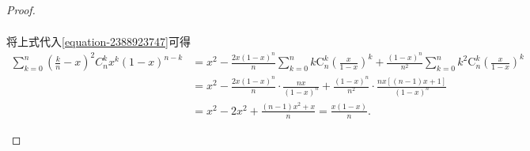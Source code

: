 \documentclass[../../main.tex]{subfiles}
\begin{document}
\begin{proof}
\begin{enumerate}
\begin{gather*}
\end{gather*}
将上式代入\eqref{equation-2388923747}可得
\begin{align*}
\sum_{k=0}^n{\left( \frac{k}{n}-x \right) ^2C_{n}^{k}x^k\left( 1-x \right) ^{n-k}}&=x^2-\frac{2x\left( 1-x \right) ^n}{n}\sum_{k=0}^n{k\mathrm{C}_{n}^{k}\left( \frac{x}{1-x} \right) ^k}+\frac{\left( 1-x \right) ^n}{n^2}\sum_{k=0}^n{k^2\mathrm{C}_{n}^{k}\left( \frac{x}{1-x} \right) ^k}
\\
&=x^2-\frac{2x\left( 1-x \right) ^n}{n}\cdot \frac{nx}{\left( 1-x \right) ^n}+\frac{\left( 1-x \right) ^n}{n^2}\cdot \frac{nx\left[ \left( n-1 \right) x+1 \right]}{\left( 1-x \right) ^n}
\\
&=x^2-2x^2+\frac{\left( n-1 \right) x^2+x}{n}=\frac{x\left( 1-x \right)}{n}.
\end{align*}
\end{enumerate}
\end{proof}
\end{document}
